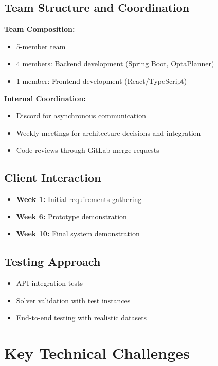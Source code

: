 \documentclass[12pt,a4paper]{report}
\begin{document}
\subsection{Team Structure and Coordination}

\textbf{Team Composition:}
\begin{itemize}
    \item 5-member team
    \item 4 members: Backend development (Spring Boot, OptaPlanner)
    \item 1 member: Frontend development (React/TypeScript)
\end{itemize}

\textbf{Internal Coordination:}
\begin{itemize}
    \item Discord for asynchronous communication
    \item Weekly meetings for architecture decisions and integration
    \item Code reviews through GitLab merge requests
\end{itemize}

\subsection{Client Interaction}

\begin{itemize}
    \item \textbf{Week 1:} Initial requirements gathering
    \item \textbf{Week 6:} Prototype demonstration
    \item \textbf{Week 10:} Final system demonstration
\end{itemize}

\subsection{Testing Approach}

\begin{itemize}
    \item API integration tests
    \item Solver validation with test instances
    \item End-to-end testing with realistic datasets
\end{itemize}

\section{Key Technical Challenges}
\end{document}
